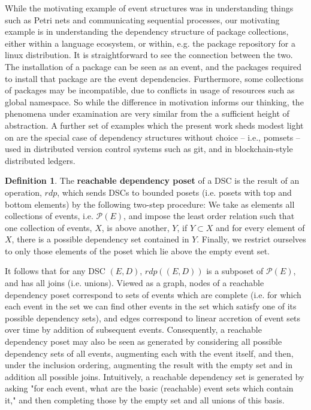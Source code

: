 \documentclass[hoptionsi,review,format=sigplan]{acmart}
\theoremstyle{definition}
\newtheorem{definition}{Definition}[section]
\newcommand{\Pc}{\mathcal{P}}
\begin{document}
While the motivating example of event structures was in understanding things such as Petri nets and communicating sequential processes, our motivating example is in understanding the dependency structure of package collections, either within a language ecosystem, or within, e.g. the package repository for a linux distribution. It is straightforward to see the connection between the two. The installation of a package can be seen as an event, and the packages required to install that package are the event dependencies. Furthermore, some collections of packages may be incompatible, due to conflicts in usage of resources such as global namespace. So while the difference in motivation informs our thinking, the phenomena under examination are very similar from the a sufficient height of abstraction. A further set of examples which the present work sheds modest light on are the special case of dependency structures without choice -- i.e., pomsets -- used in distributed version control systems such as git, and in blockchain-style distributed ledgers.

\begin{definition} The \textbf{reachable dependency poset} of a DSC is the result of an operation, \(rdp\), which sends DSCs to bounded posets (i.e. posets with top and bottom elements) by the following two-step procedure:  We take as elements all collections of events, i.e. \(\Pc(E)\), and impose the least order relation such that one collection of events, \(X\), is above another, \(Y\), if \(Y \subset X\) and for every element of \(X\), there is a possible dependency set contained in \(Y\).  Finally, we restrict ourselves to only those elements of the poset which lie above the empty event set. 
\end{definition}

It follows that for any DSC \((E,D)\), \(rdp((E,D))\)  is a subposet of \(\Pc(E)\), and has all joins (i.e. unions). Viewed as a graph, nodes of a reachable dependency poset correspond to sets of events which are complete (i.e. for which each event in the set we can find other events in the set which satisfy one of its possible dependency sets), and edges correspond to linear accretion of event sets over time by addition of subsequent events. Consequently, a reachable dependency poset may also be seen as generated by considering all possible dependency sets of all events, augmenting each with the event itself, and then, under the inclusion ordering, augmenting the result with the empty set and in addition all possible joins. Intuitively, a reachable dependency set is generated by asking "for each event, what are the basic (reachable) event sets which contain it," and then completing those by the empty set and all unions of this basis.
\end{document}
